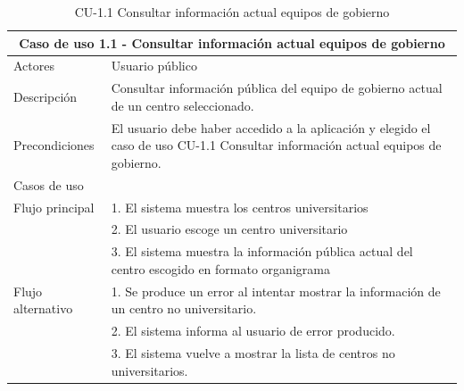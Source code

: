\begin{table}[H]
\caption{CU-1.1 Consultar información actual equipos de gobierno}
        \label{tab:CU-1.1}
        \begin{center}
            \begin{tabular}{|l|p{12cm}|}
                \hline
                \multicolumn{2}{|c|}{Caso de uso 1.1 - Consultar información actual equipos de gobierno} \\ \hline \hline
                Actores                 &   Usuario público          \\  \hline
                Descripción             &   Consultar información pública del equipo de gobierno actual de un centro seleccionado. \\  \hline
                Precondiciones          &   El usuario debe haber accedido a la aplicación y elegido el caso de uso CU-1.1 Consultar información actual equipos de gobierno.  \\  \hline
                Casos de uso            &   \\  \hline
                Flujo principal         &   1. El sistema muestra los centros universitarios   \\
                                        &   2. El usuario escoge un centro universitario    \\ 
                       & 3. El sistema muestra la información pública actual del centro escogido en formato organigrama \\ \hline
                Flujo alternativo    &   1. Se produce un error al intentar mostrar la información de un  centro no universitario. 
                \\  & 2. El sistema informa al usuario de error producido. 
                \\  & 3. El sistema vuelve a mostrar la lista de centros no universitarios.
                \\\hline
            \end{tabular}
        \end{center}
    \end{table}
    
